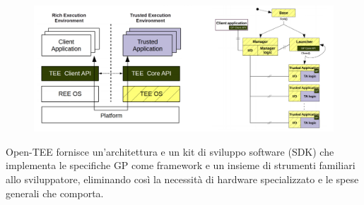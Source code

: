 \begin{figure}[htb!]
    \centering
    \includegraphics[width=12cm]{./Images/cap6/6.9.png}
\end{figure}

Open-TEE fornisce un'architettura e un kit di sviluppo software (SDK) che
implementa le specifiche GP come framework e un insieme di strumenti
familiari allo sviluppatore, eliminando così la necessità di hardware
specializzato e le spese generali che comporta.
